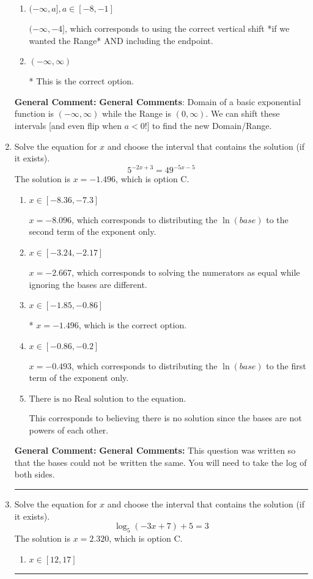 \documentclass{extbook}[14pt]
\newcommand{\litem}[1]{\item #1

\rule{\textwidth}{0.4pt}}
\begin{document}
\begin{enumerate}
{\begin{enumerate}[label=\Alph*.]
$(-\infty, -4)$, which corresponds to using the correct vertical shift *if we wanted the Range*.
\item \( (-\infty, a], a \in [-8, -1] \)

$(-\infty, -4]$, which corresponds to using the correct vertical shift *if we wanted the Range* AND including the endpoint.
\item \( (-\infty, \infty) \)

* This is the correct option.
\end{enumerate}

\textbf{General Comment:} \textbf{General Comments}: Domain of a basic exponential function is $(-\infty, \infty)$ while the Range is $(0, \infty)$. We can shift these intervals [and even flip when $a<0$!] to find the new Domain/Range.
}
\litem{
Solve the equation for $x$ and choose the interval that contains the solution (if it exists).
\[ 5^{-2x+3} = 49^{-5x-5} \]The solution is \( x = -1.496 \), which is option C.\begin{enumerate}[label=\Alph*.]
\item \( x \in [-8.36, -7.3] \)

$x = -8.096$, which corresponds to distributing the $\ln(base)$ to the second term of the exponent only.
\item \( x \in [-3.24, -2.17] \)

$x = -2.667$, which corresponds to solving the numerators as equal while ignoring the bases are different.
\item \( x \in [-1.85, -0.86] \)

* $x = -1.496$, which is the correct option.
\item \( x \in [-0.86, -0.2] \)

$x = -0.493$, which corresponds to distributing the $\ln(base)$ to the first term of the exponent only.
\item \( \text{There is no Real solution to the equation.} \)

This corresponds to believing there is no solution since the bases are not powers of each other.
\end{enumerate}

\textbf{General Comment:} \textbf{General Comments:} This question was written so that the bases could not be written the same. You will need to take the log of both sides.
}
\litem{
Solve the equation for $x$ and choose the interval that contains the solution (if it exists).
\[ \log_{5}{(-3x+7)}+5 = 3 \]The solution is \( x = 2.320 \), which is option C.\begin{enumerate}[label=\Alph*.]
\item \( x \in [12, 17] \)


\end{enumerate}}
\end{enumerate}
\end{document}
